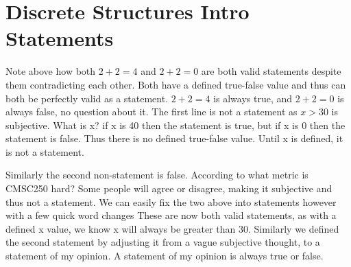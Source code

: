 \documentclass{report}
\begin{document}
\chapter{Discrete Structures Intro Statements}
Note above how both $2+2=4$ and $2+2=0$ are both valid statements despite them contradicting each other. Both have a defined true-false value and thus can both be perfectly valid as a statement. $2+2=4$ is always true, and $2+2=0$ is always false, no question about it.
The first line is not a statement as $x>30$ is subjective. What is x? if x is 40 then the statement is true, but if x is 0 then the statement is false. Thus there is no defined true-false value. Until x is defined, it is not a statement.

Similarly the second non-statement is false. According to what metric is CMSC250 hard? Some people will agree or disagree, making it subjective and thus not a statement. We can easily fix the two above into statements however with a few quick word changes
These are now both valid statements, as with a defined x value, we know x will always be greater than 30.
Similarly we defined the second statement by adjusting it from a vague subjective thought, to a statement of my opinion. A statement of my opinion is always true or false.
\end{document}
